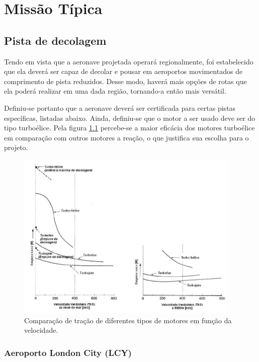 \chapter{Missão Típica}
\label{missao_tipica_parte2}
\section{Pista de decolagem}

Tendo em vista que a aeronave projetada operará regionalmente, foi estabelecido que ela deverá ser capaz de decolar e pousar em aeroportos movimentados de comprimento de pista reduzidos.
Desse modo, haverá mais opções de rotas que ela poderá realizar em uma dada região, tornando-a então mais versátil.

Definiu-se portanto que a aeronave deverá ser certificada para certas pistas específicas, listadas abaixo.
Ainda, definiu-se que o motor a ser usado deve ser do tipo turboélice.
Pela figura \ref{fig:motoresVelocidade} percebe-se a maior eficácia dos motores turboélice em comparação com outros motores a reação, o que justifica sua escolha para o projeto.

\begin{figure}[H]
  \label{fig:motoresVelocidade}
  \caption{Comparação de tração de diferentes tipos de motores em função da velocidade.}
  \centering
    \includegraphics[width=0.95\textwidth]{images/parte2/graficosMotores}
\end{figure}

\subsection{Aeroporto London City (LCY)}

